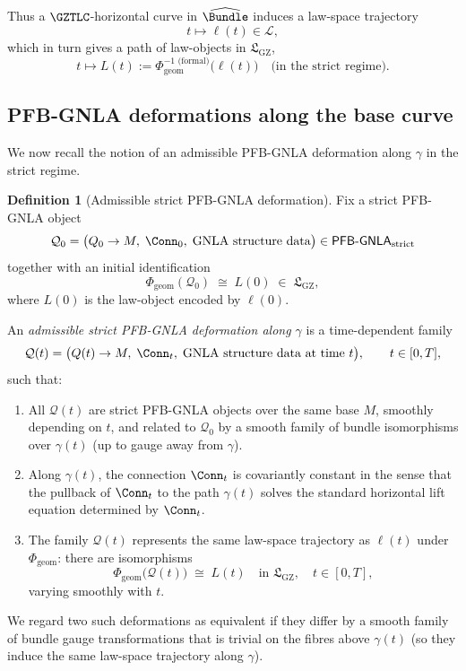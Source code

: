 \documentclass[11pt]{book}
\theoremstyle{plain}
\theoremstyle{definition}
\newtheorem{definition}[theorem]{Definition} \theoremstyle{remark}
\newcommand{\GZLS}{\ensuremath{\mathfrak{L}_{\mathrm{GZ}}}}       \newcommand{\GZLT}{\ensuremath{M_{!w}}}                           \newcommand{\GZLOC}{\ensuremath{A_M}}                             \newcommand{\GZLCurv}{\ensuremath{\mathcal{F}_{\mathrm{law}}}}
\begin{document}
Thus a \(\GZTLC\)-horizontal curve in \(\widehat{\Bundle}\) induces a
law-space trajectory
\[
  t\longmapsto \ell(t)\in\mathcal{L},
\]
which in turn gives a path of law-objects in \(\GZLS\),
\[
  t\longmapsto L(t)
  := \Phi_{\mathrm{geom}}^{-1\text{ (formal)}}\bigl(\ell(t)\bigr)
  \quad\text{(in the strict regime)}.
\]



\subsection*{PFB-GNLA deformations along the base curve}


We now recall the notion of an admissible PFB-GNLA deformation along
\(\gamma\) in the strict regime.

\begin{definition}[Admissible strict PFB-GNLA deformation]
Fix a strict PFB-GNLA object
\[
  \mathcal{Q}_0
  =
  \bigl(Q_0\to M,\;
        \Conn_0,\;
        \text{GNLA structure data}\bigr)
  \in \mathsf{PFB\text- GNLA}_{\mathrm{strict}}
\]
together with an initial identification
\[
  \Phi_{\mathrm{geom}}(\mathcal{Q}_0)
  \;\cong\;
  L(0)\;\in\;\GZLS,
\]
where \(L(0)\) is the law-object encoded by \(\ell(0)\).

An \emph{admissible strict PFB-GNLA deformation along \(\gamma\)} is a
time-dependent family
\[
  \mathcal{Q}(t)
  =
  \bigl(Q(t)\to M,\;
        \Conn_t,\;
        \text{GNLA structure data at time }t\bigr),
  \qquad t\in[0,T],
\]
such that:
\begin{enumerate}
  \item[(i)] All \(\mathcal{Q}(t)\) are strict PFB-GNLA objects over
    the same base \(M\), smoothly depending on \(t\), and related
    to \(\mathcal{Q}_0\) by a smooth family of bundle isomorphisms
    over \(\gamma(t)\) (up to gauge away from \(\gamma\)).
  \item[(ii)] Along \(\gamma(t)\), the connection \(\Conn_t\) is
    covariantly constant in the sense that the pullback of \(\Conn_t\)
    to the path \(\gamma(t)\) solves the standard horizontal lift
    equation determined by \(\Conn_t\).
  \item[(iii)] The family \(\mathcal{Q}(t)\) represents the same
    law-space trajectory as \(\ell(t)\) under \(\Phi_{\mathrm{geom}}\):
    there are isomorphisms
    \[
      \Phi_{\mathrm{geom}}\bigl(\mathcal{Q}(t)\bigr)
      \;\cong\;
      L(t)
      \quad\text{in }\GZLS,\quad t\in[0,T],
    \]
    varying smoothly with \(t\).
\end{enumerate}
We regard two such deformations as equivalent if they differ by a
smooth family of bundle gauge transformations that is trivial on the
fibres above \(\gamma(t)\) (so they induce the same law-space
trajectory along \(\gamma\)).
\end{definition}
\end{document}
